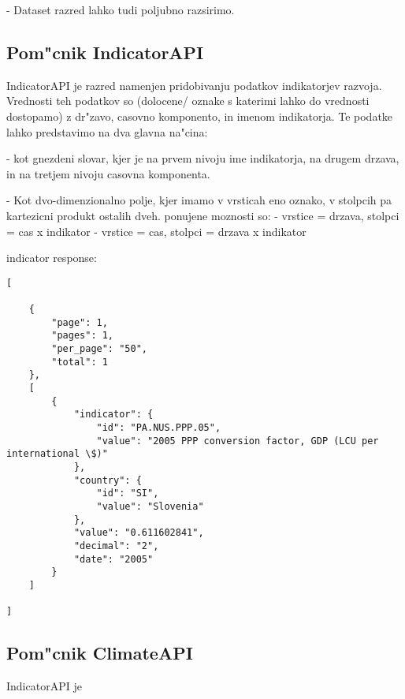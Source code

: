 - Dataset razred lahko tudi poljubno razsirimo.



\subsection{Pom"cnik IndicatorAPI}

IndicatorAPI je razred namenjen pridobivanju podatkov indikatorjev razvoja.
Vrednosti teh podatkov so (dolocene/ oznake s katerimi lahko do vrednosti
dostopamo) z dr"zavo, casovno komponento, in imenom indikatorja. Te podatke
lahko predstavimo na dva glavna na"cina:

 - kot gnezdeni slovar, kjer je na prvem nivoju ime indikatorja, na drugem
   drzava, in na tretjem nivoju casovna komponenta.

 - Kot dvo-dimenzionalno polje, kjer imamo v vrsticah eno oznako, v stolpcih
   pa kartezicni produkt ostalih dveh. ponujene moznosti so:
   - vrstice = drzava, stolpci = cas x indikator
   - vrstice = cas, stolpci = drzava x indikator






% 
% 
% 
% 
% 
% 


indicator response:

\begin{verbatim}
[

    {
        "page": 1,
        "pages": 1,
        "per_page": "50",
        "total": 1
    },
    [
        {
            "indicator": {
                "id": "PA.NUS.PPP.05",
                "value": "2005 PPP conversion factor, GDP (LCU per international \$)"
            },
            "country": {
                "id": "SI",
                "value": "Slovenia"
            },
            "value": "0.611602841",
            "decimal": "2",
            "date": "2005"
        }
    ]

]
\end{verbatim}


\subsection{Pom"cnik ClimateAPI}

IndicatorAPI je 



% 
% 



